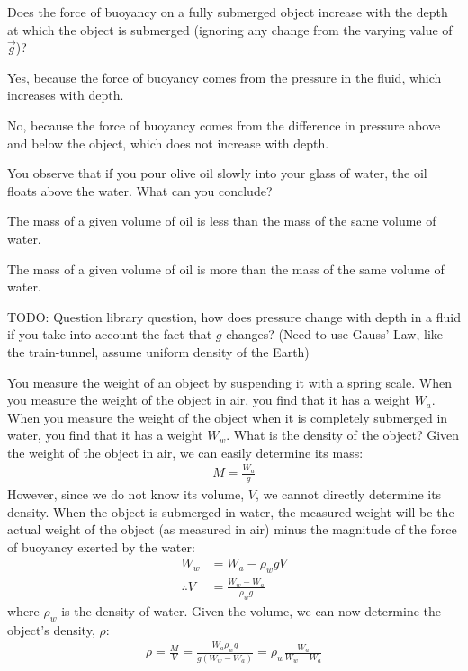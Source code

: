 {{\begin{checkpoint}
\begin{MCquestion}{Does the force of buoyancy on a fully submerged object increase with the depth at which the object is submerged (ignoring any change from the varying value of $\vec g$)?}
\item Yes, because the force of buoyancy comes from the pressure in the fluid, which increases with depth. 
\item No, because the force of buoyancy comes from the difference in pressure above and below the object, which does not increase with depth. \correct
\end{MCquestion}
\end{checkpoint}

\begin{checkpoint}
\begin{MCquestion}{You observe that if you pour olive oil slowly into your glass of water, the oil floats above the water. What can you conclude?}
\item The mass of a given volume of oil is less than the mass of the same volume of water. \correct
\item The mass of a given volume of oil is more than the mass of the same volume of water.  
\end{MCquestion}
\end{checkpoint}

TODO: Question library question, how does pressure change with depth in a fluid if you take into account the fact that $g$ changes? (Need to use Gauss' Law, like the train-tunnel, assume uniform density of the Earth)

\begin{example}{You measure the weight of an object by suspending it with a spring scale. When you measure the weight of the object in air, you find that it has a weight $W_{a}$. When you measure the weight of the object when it is completely submerged in water, you find that it has a weight $W_w$. What is the density of the object?}
Given the weight of the object in air, we can easily determine its mass:
\begin{align*}
M = \frac{W_a}{g}
\end{align*}
However, since we do not know its volume, $V$, we cannot directly determine its density. When the object is submerged in water, the measured weight will be the actual weight of the object (as measured in air) minus the magnitude of the force of buoyancy exerted by the water:
\begin{align*}
W_w &= W_a - \rho_w g V\\
\therefore V &= \frac{W_w -W_a}{\rho_w g}
\end{align*}
where $\rho_w$ is the density of water. Given the volume, we can now determine the object's density, $\rho$:
\begin{align*}
\rho = \frac{M}{V}=\frac{W_a\rho_w g}{g (W_w -W_a)}=\rho_w\frac{W_a}{W_w -W_a}
\end{align*}


\end{example}}}
